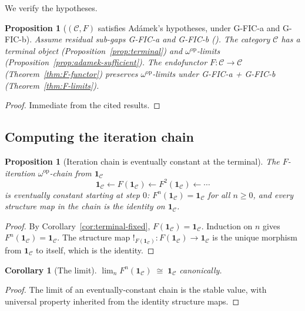 \documentclass[11pt, a4paper]{amsart}
\newtheorem{proposition}[theorem]{Proposition}
\newtheorem{corollary}[theorem]{Corollary}
\theoremstyle{definition}
\newcommand{\catC}{\mathcal{C}}
\begin{document}
We verify the hypotheses.

\begin{proposition}[$(\catC, F)$ satisfies Ad\'amek's
  hypotheses, under G-FIC-a and G-FIC-b]
\label{prop:adamek-applies}
Assume residual sub-gaps G-FIC-a and G-FIC-b
(\cite{CascadeHFICClosure}). The category $\catC$ has a
terminal object (Proposition~\ref{prop:terminal}) and
$\omega^{\mathrm{op}}$-limits
(Proposition~\ref{prop:adamek-sufficient}). The endofunctor
$F \colon \catC \to \catC$ (Theorem~\ref{thm:F-functor})
preserves $\omega^{\mathrm{op}}$-limits under G-FIC-a +
G-FIC-b (Theorem~\ref{thm:F-limits}).
\end{proposition}

\begin{proof}
Immediate from the cited results.
\end{proof}

\subsection{Computing the iteration chain}

\begin{proposition}[Iteration chain is eventually constant at
  the terminal]
\label{prop:chain-trivial}
The $F$-iteration $\omega^{\mathrm{op}}$-chain from
$\mathbf{1}_\catC$
\[
    \mathbf{1}_\catC \xleftarrow{} F(\mathbf{1}_\catC)
    \xleftarrow{} F^2(\mathbf{1}_\catC) \xleftarrow{} \cdots
\]
is \emph{eventually constant starting at step $0$}:
$F^n(\mathbf{1}_\catC) = \mathbf{1}_\catC$ for all $n \geq 0$,
and every structure map in the chain is the identity on
$\mathbf{1}_\catC$.
\end{proposition}

\begin{proof}
By Corollary~\ref{cor:terminal-fixed},
$F(\mathbf{1}_\catC) = \mathbf{1}_\catC$. Induction on $n$ gives
$F^n(\mathbf{1}_\catC) = \mathbf{1}_\catC$. The structure map
$!_{F(\mathbf{1}_\catC)} \colon F(\mathbf{1}_\catC) \to
\mathbf{1}_\catC$ is the unique morphism from $\mathbf{1}_\catC$
to itself, which is the identity.
\end{proof}

\begin{corollary}[The limit]
\label{cor:limit-terminal}
$\lim_n F^n(\mathbf{1}_\catC) \;\cong\; \mathbf{1}_\catC$
canonically.
\end{corollary}

\begin{proof}
The limit of an eventually-constant chain is the stable value,
with universal property inherited from the identity structure
maps.
\end{proof}
\end{document}

